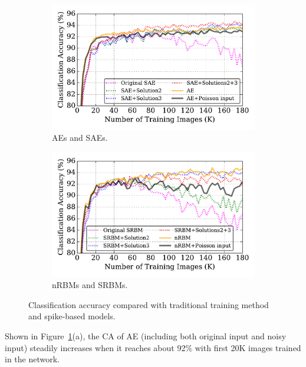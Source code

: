 \begin{figure}
	\centering
	\begin{subfigure}[t]{0.49\textwidth}
		\includegraphics[width=\textwidth]{pics_sdlm/43_MNIST_SAE_all/compare_result.pdf}
		\caption{AEs and SAEs.}
	\end{subfigure}
	\begin{subfigure}[t]{0.49\textwidth}
		\includegraphics[width=\textwidth]{pics_sdlm/53_MNIST_SRBM_all/compare_result.pdf}
		\caption{nRBMs and SRBMs.}
	\end{subfigure}
	\caption{Classification accuracy compared with traditional training method and spike-based models.}
	\label{fig:sdlm_ca}
\end{figure}
Shown in Figure~\ref{fig:sdlm_ca}(a), the CA of AE (including both original input and noisy input) steadily increases when it reaches about 92\% with first 20K images trained in the network.
